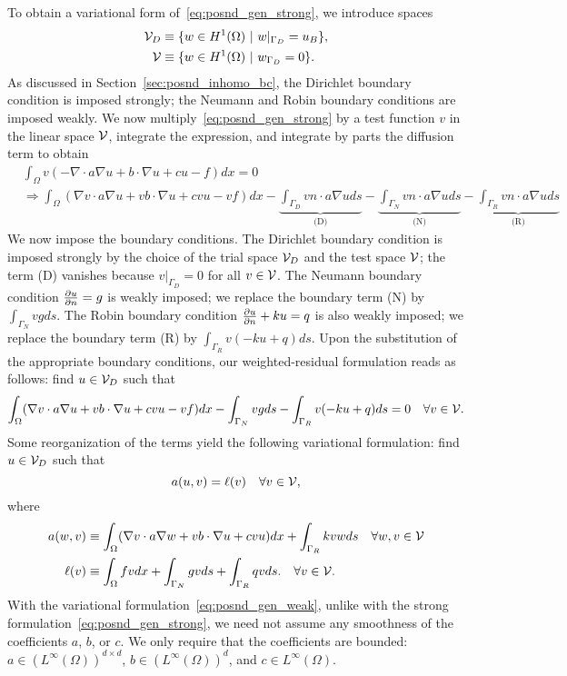 To obtain a variational form of~\eqref{eq:posnd_gen_strong}, we introduce spaces
\begin{align*}
  \mathcal{V}_D &\equiv \{ w \in H^1(\Omega) \ | \ w|_{\Gamma_D} = u_B \}, \\
  \mathcal{V} &\equiv \{ w \in H^1(\Omega) \ | \ w_{\Gamma_D} = 0 \}.
\end{align*}
As discussed in Section~\ref{sec:posnd_inhomo_bc}, the Dirichlet boundary condition is imposed strongly; the Neumann and Robin boundary conditions are imposed weakly.  We now multiply~\eqref{eq:posnd_gen_strong} by a test function $v$ in the linear space $\mathcal{V}$, integrate the expression, and integrate by parts the diffusion term to obtain
\begin{align*}
  &\int_\Omega v (- \nabla \cdot a \nabla u + b \cdot \nabla u + c u - f) dx = 0 \\
  & \Rightarrow
  \int_\Omega (\nabla v \cdot a \nabla u  + v b \cdot \nabla u + c vu -vf ) dx
  -  \underbrace{\int_{\Gamma_D} v n \cdot a \nabla u ds}_{\text{(D)}}
  - \underbrace{\int_{\Gamma_N} v n \cdot a \nabla u ds}_{\text{(N)}}
  - \underbrace{\int_{\Gamma_R} v n \cdot a \nabla u ds}_{\text{(R)}}
\end{align*}
We now impose the boundary conditions.  The Dirichlet boundary condition is imposed strongly by the choice of the trial space $\mathcal{V}_D$ and the test space $\mathcal{V}$; the term (D) vanishes because $v|_{\Gamma_D} = 0$ for all $v \in \mathcal{V}$.  The Neumann boundary condition $\frac{\partial u}{\partial n} = g$ is weakly imposed; we replace the boundary term (N) by $\int_{\Gamma_N} v g ds$.  The Robin boundary condition $\frac{\partial u}{\partial n} + k u = q$ is also weakly imposed; we replace the boundary term (R) by $\int_{\Gamma_R} v (-ku + q) ds$.  Upon the substitution of the appropriate boundary conditions, our weighted-residual formulation reads as follows: find $u \in \mathcal{V}_D$ such that
\begin{equation*}
  \int_\Omega (\nabla v \cdot a \nabla u  + v b \cdot \nabla u + c vu - vf) dx
  - \int_{\Gamma_N} v g ds - \int_{\Gamma_R} v (-ku + q) ds = 0
  \quad \forall v \in \mathcal{V}.
\end{equation*}
Some reorganization of the terms yield the following variational formulation: find $u \in \mathcal{V}_D$ such that
\begin{equation}
  a(u,v) = \ell(v) \quad \forall v \in \mathcal{V},
  \label{eq:posnd_gen_weak}
\end{equation}
where
\begin{align*}
  a(w,v) &\equiv \int_\Omega (\nabla v \cdot a \nabla w + v b \cdot \nabla u + c vu ) dx + \int_{\Gamma_R} k vw ds \quad \forall w, v \in \mathcal{V} \\
  \ell(v) &\equiv \int_\Omega fv dx + \int_{\Gamma_N} gv ds + \int_{\Gamma_R} qv ds.
  \quad \forall v \in \mathcal{V}.
\end{align*}
With the variational formulation~\eqref{eq:posnd_gen_weak}, unlike with the strong formulation~\eqref{eq:posnd_gen_strong}, we need not assume any smoothness of the coefficients $a$, $b$, or $c$.  We only require that the coefficients are bounded: $a \in (L^\infty(\Omega))^{d \times d}$, $b \in (L^\infty(\Omega))^d$, and $c \in L^\infty(\Omega)$.

